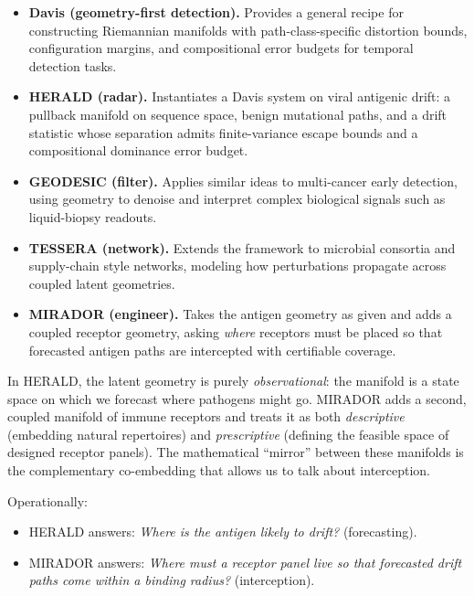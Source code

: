 \documentclass[11pt]{article}
\begin{document}
\begin{itemize}
  \item \textbf{Davis (geometry-first detection).} Provides a general recipe for constructing Riemannian manifolds with path-class-specific distortion bounds, configuration margins, and compositional error budgets for temporal detection tasks.

  \item \textbf{HERALD (radar).} Instantiates a Davis system on viral antigenic drift: a pullback manifold on sequence space, benign mutational paths, and a drift statistic whose separation admits finite-variance escape bounds and a compositional dominance error budget.

  \item \textbf{GEODESIC (filter).} Applies similar ideas to multi-cancer early detection, using geometry to denoise and interpret complex biological signals such as liquid-biopsy readouts.

  \item \textbf{TESSERA (network).} Extends the framework to microbial consortia and supply-chain style networks, modeling how perturbations propagate across coupled latent geometries.

  \item \textbf{MIRADOR (engineer).} Takes the antigen geometry as given and adds a coupled receptor geometry, asking \emph{where} receptors must be placed so that forecasted antigen paths are intercepted with certifiable coverage.
\end{itemize}

In HERALD, the latent geometry is purely \emph{observational}: the manifold is a state space on which we forecast where pathogens might go. MIRADOR adds a second, coupled manifold of immune receptors and treats it as both \emph{descriptive} (embedding natural repertoires) and \emph{prescriptive} (defining the feasible space of designed receptor panels). The mathematical ``mirror'' between these manifolds is the complementary co-embedding that allows us to talk about interception.

Operationally:

\begin{itemize}
  \item HERALD answers: \emph{Where is the antigen likely to drift?} (forecasting).
  \item MIRADOR answers: \emph{Where must a receptor panel live so that forecasted drift paths come within a binding radius?} (interception).
\end{itemize}
\end{document}
